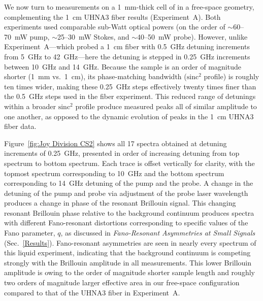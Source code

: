 We now turn to measurements on a \SI{1}{\milli\meter}-thick cell of  in a free-space geometry, complementing the \SI{1}{\centi\meter} UHNA3 fiber results (Experiment~A). Both experiments used comparable sub-Watt optical powers (on the order of \(\sim\)60–\SI{70}{\milli\watt} pump, \(\sim\)25–\SI{30}{\milli\watt} Stokes, and \(\sim\)40–\SI{50}{\milli\watt} probe). However, unlike Experiment~A—which probed a \SI{1}{\centi\meter} fiber with \SI{0.5}{\giga\hertz} detuning increments from \SI{5}{\giga\hertz} to \SI{42}{\giga\hertz}—here the detuning is stepped in \SI{0.25}{\giga\hertz} increments between \SI{10}{\giga\hertz} and \SI{14}{\giga\hertz}. Because the  sample is an order of magnitude shorter (\SI{1}{\milli\meter} vs.\ \SI{1}{\centi\meter}), its phase-matching bandwidth (\(\mathrm{sinc}^{2}\) profile) is roughly ten times wider, making these \SI{0.25}{\giga\hertz} steps effectively twenty times finer than the \SI{0.5}{\giga\hertz} steps used in the fiber experiment. This reduced range of detunings within a broader \(\mathrm{sinc^2}\) profile produce measured peaks all of similar amplitude to one another, as opposed to the dynamic evolution of peaks in the \SI{1}{\centi\meter} UHNA3 fiber data.

Figure~\ref{fig:Joy Division CS2} shows all 17 spectra obtained at detuning increments of \SI{0.25}{\giga\hertz}, presented in order of increasing detuning from top spectrum to bottom spectrum. Each trace is offset vertically for clarity, with the topmost spectrum corresponding to \SI{10}{\giga\hertz} and the bottom spectrum corresponding to \SI{14}{\giga\hertz} detuning of the pump and the probe. A change in the detuning of the pump and probe via adjustment of the probe laser wavelength produces a change in phase of the resonant Brillouin signal. This changing resonant Brillouin phase relative to the background continuum produces spectra with different Fano-resonant distortions corresponding to specific values of the Fano parameter, \(q\), as discussed in \textit{Fano-Resonant Asymmetries at Small Signals} (Sec.~\ref{Results}). Fano-resonant asymmetries are seen in nearly every spectrum of this liquid experiment, indicating that the background continuum is competing strongly with the Brillouin amplitude in all measurements. This lower Brillouin amplitude is owing to the order of magnitude shorter sample length and roughly two orders of magnitude larger effective area in our free-space configuration compared to that of the UHNA3 fiber in Experiment~A.

